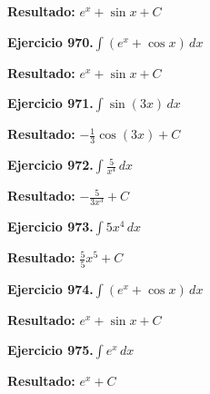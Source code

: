 \documentclass[10pt,a4paper]{article}
\begin{document}
\begin{solbox}
\textbf{Resultado:} \(\displaystyle e^x + \sin x + C\)
\end{solbox}

\newpage
\begin{ejbox}
\textbf{Ejercicio 970.}\quad $\int (e^x + \cos x)\,dx$
\end{ejbox}

\begin{solbox}
\textbf{Resultado:} \(\displaystyle e^x + \sin x + C\)
\end{solbox}

\begin{ejbox}
\textbf{Ejercicio 971.}\quad $\int \sin(3x)\,dx$
\end{ejbox}

\begin{solbox}
\textbf{Resultado:} \(\displaystyle -\frac{1}{3}\cos(3x) + C\)
\end{solbox}

\begin{ejbox}
\textbf{Ejercicio 972.}\quad $\int \frac{5}{x^{4}}\,dx$
\end{ejbox}

\begin{solbox}
\textbf{Resultado:} \(\displaystyle -\frac{5}{3x^{3}} + C\)
\end{solbox}

\newpage
\begin{ejbox}
\textbf{Ejercicio 973.}\quad $\int 5x^{4}\,dx$
\end{ejbox}

\begin{solbox}
\textbf{Resultado:} \(\displaystyle \frac{5}{5}x^{5} + C\)
\end{solbox}

\begin{ejbox}
\textbf{Ejercicio 974.}\quad $\int (e^x + \cos x)\,dx$
\end{ejbox}

\begin{solbox}
\textbf{Resultado:} \(\displaystyle e^x + \sin x + C\)
\end{solbox}

\begin{ejbox}
\textbf{Ejercicio 975.}\quad $\int e^x\,dx$
\end{ejbox}

\begin{solbox}
\textbf{Resultado:} \(\displaystyle e^x + C\)
\end{solbox}
\end{document}

